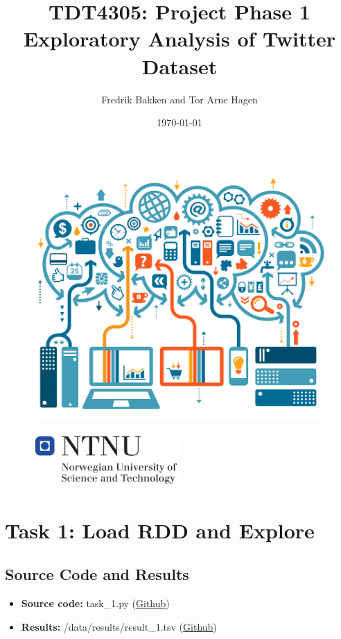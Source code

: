 \documentclass{article}
\title{TDT4305: Project Phase 1\\Exploratory Analysis of Twitter Dataset}
\author{Fredrik Bakken and Tor Arne Hagen}
\date{\today}
\begin{document}
\maketitle

\begin{figure}[H]
    \centering
    \includegraphics[width=\textwidth]{PhaseOne/docs/img/big-data.png}
\end{figure}

\begin{figure}[H]
    \centering
    \includegraphics[width=0.5\textwidth]{PhaseOne/docs/img/ntnu.png}
\end{figure}

\newpage

\section*{Task 1: Load RDD and Explore}
\subsection*{Source Code and Results}
    \begin{itemize}
        \item \textbf{Source code:} task\_1.py (\href{https://github.com/FredrikBakken/TDT4305_Big-Data-Project/blob/master/PhaseOne/task_1.py}{Github})
        \item \textbf{Results:} /data/results/result\_1.tsv (\href{https://github.com/FredrikBakken/TDT4305_Big-Data-Project/blob/master/PhaseOne/data/results/result_1.tsv}{Github})
    \end{itemize}
\end{document}
